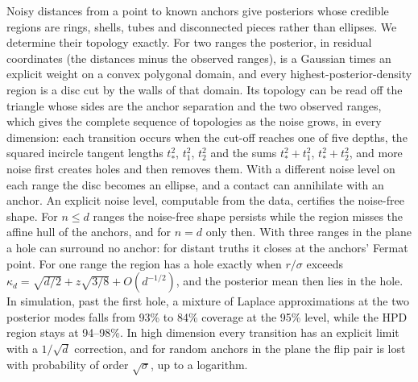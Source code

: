 Noisy distances from a point to known anchors give posteriors whose credible regions are rings, shells, tubes and
disconnected pieces rather than ellipses. We determine their topology exactly. For two ranges the posterior, in residual
coordinates (the distances minus the observed ranges), is a Gaussian times an explicit weight on a
convex polygonal domain, and every highest-posterior-density region is a disc cut by the walls of that domain. Its
topology can be read off the triangle whose sides are the anchor separation and the two observed ranges,
which gives the complete sequence of topologies as the noise grows, in every dimension: each transition occurs when the
cut-off reaches one of five depths, the squared incircle tangent lengths $t_*^2$, $t_1^2$, $t_2^2$ and the sums
$t_*^2 + t_1^2$, $t_*^2 + t_2^2$, and more noise first creates holes and then removes them. With a different noise level
on each range the disc becomes an ellipse, and a contact can annihilate with an anchor. An explicit noise level,
computable from the data, certifies the noise-free shape. For $n \le d$ ranges the noise-free shape persists while the
region misses the affine hull of the anchors, and for $n = d$ only then. With three ranges in the plane a hole can
surround no anchor: for distant truths it closes at the anchors' Fermat point. For one range the region has a hole
exactly when $r/\sigma$ exceeds $\kappa_d = \sqrt{d/2} + z\sqrt{3/8} + O(d^{-1/2})$, and the posterior mean then lies in
the hole. In simulation, past the first hole, a mixture of Laplace approximations at the two
posterior modes falls from 93\% to 84\% coverage at the 95\% level, while the HPD region stays at 94--98\%. In high
dimension every transition has an explicit limit with a $1/\sqrt d$ correction, and for random anchors in the plane the
flip pair is lost with probability of order $\sqrt\sigma$, up to a logarithm.
